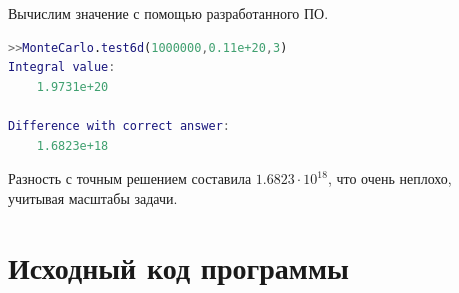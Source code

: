 \documentclass[a4paper,12pt]{article}
\begin{document}
Вычислим значение с помощью разработанного ПО.

\begin{lstlisting}[language=MATLAB]
>>MonteCarlo.test6d(1000000,0.11e+20,3)
Integral value:
	1.9731e+20

Difference with correct answer:
	1.6823e+18
\end{lstlisting}

Разность с точным решением составила $1.6823 \cdot 10^{18}$, что очень неплохо, учитывая масштабы задачи.



\newpage
\section{Исходный код программы}
\end{document}
